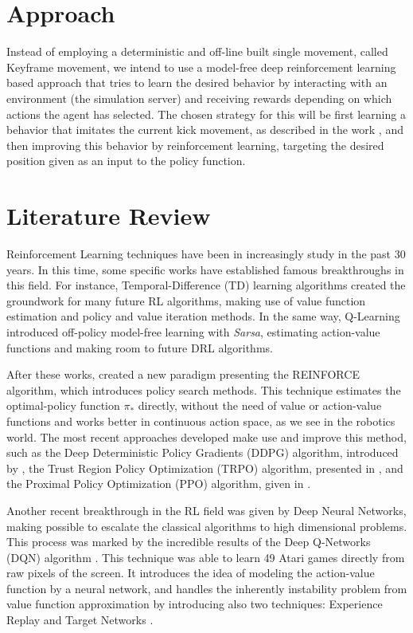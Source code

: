 \section{Approach}

Instead of employing a deterministic and off-line built single movement, called Keyframe movement, we intend to use a model-free deep reinforcement learning based approach that tries to learn the desired behavior by interacting with an environment (the simulation server) and receiving rewards depending on which actions the agent has selected.
The chosen strategy for this will be first learning a behavior that imitates the current kick movement, as described in the work \cite{deepmimic}, and then improving this behavior by reinforcement learning, targeting the desired position given as an input to the policy function.

\section{Literature Review}

Reinforcement Learning techniques have been in increasingly study in the past 30 years. In this time, some specific works have established  famous breakthroughs in this field. For instance, Temporal-Difference (TD) learning algorithms \cite{TDLearning} created the groundwork for many future RL algorithms, making use of value function estimation and policy and value iteration methods. In the same way, Q-Learning \cite{QLearning} introduced off-policy model-free learning with \textit{Sarsa}, estimating action-value functions and making room to future DRL algorithms.

After these works,  created a new paradigm presenting the REINFORCE algorithm, which introduces policy search methods. This technique estimates the optimal-policy function $\pi_*$ directly, without the need of value or action-value functions and works better in continuous action space, as we see in the robotics world. The most recent approaches developed make use and improve this method, such as the Deep Deterministic Policy Gradients (DDPG) algorithm, introduced by \cite{DDPG}, the Trust Region Policy Optimization (TRPO) algorithm, presented in \cite{TRPO}, and the Proximal Policy Optimization (PPO) algorithm, given in \cite{PPO}.

Another recent breakthrough in the RL field was given by Deep Neural Networks, making possible to escalate the classical algorithms to high dimensional problems. This process was marked by the incredible results of the Deep Q-Networks (DQN) algorithm \cite{RLNature2015}. This technique was able to learn 49 Atari games directly from raw pixels of the screen. It introduces the idea of modeling the action-value function by a neural network, and handles the inherently instability problem from value function approximation by introducing also two techniques: Experience Replay \cite{ReplayBuffer} and Target Networks \cite{RLNature2015}.

